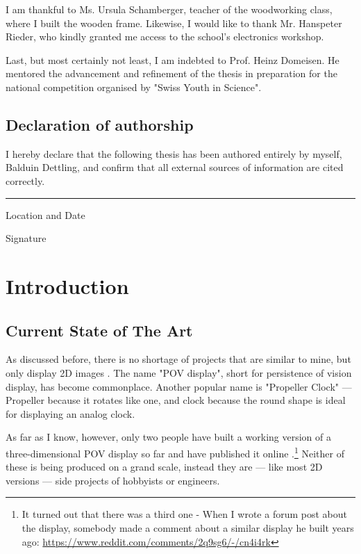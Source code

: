 \documentclass[a4paper, 11pt, titlepage]{report}
\begin{document}
I am thankful to Ms. Ursula Schamberger, teacher of the woodworking class, where I built the
wooden frame. Likewise, I would like to thank Mr. Hanspeter Rieder, who kindly granted me
access to the school's electronics workshop.

Last, but most certainly not least, I am indebted to Prof. Heinz Domeisen. He mentored the
advancement and refinement of the thesis in preparation for the national competition organised
by "Swiss Youth in Science".

\section*{Declaration of authorship}

I hereby declare that the following thesis has been authored entirely by myself, Balduin
Dettling, and confirm that all external sources of information are cited correctly.

\vspace{10mm}
\rule{\textwidth}{0.5pt}
\begin{minipage}[t]{0.5\textwidth}
Location and Date
\end{minipage}
\begin{minipage}[t]{0.5\textwidth}
\hspace{-1mm}Signature
\end{minipage}


\tableofcontents



\chapter{Introduction}


\section{Current State of The Art}

As discussed before, there is no shortage of projects that are similar to mine, but only display
2D images \cite{povdisp, attiny, propclock}. The name "POV display", short for persistence of
vision display, has become commonplace. Another popular name is "Propeller Clock" --- Propeller
because it rotates like one, and clock because the round shape is ideal for displaying an analog
clock.

As far as I know, however, only two people have built a working version of a three-dimensional POV
display so far and have published it online \cite{volumen, hotchkiss}.\footnote{It turned out that
there was a third one - When I wrote a forum post about the display, somebody made a comment about
a similar display he built years ago: \url{https://www.reddit.com/comments/2q9sg6/-/cn4i4rk}}
Neither of these is being produced on a grand scale, instead they are --- like most 2D versions
--- side projects of hobbyists or engineers.
\end{document}
